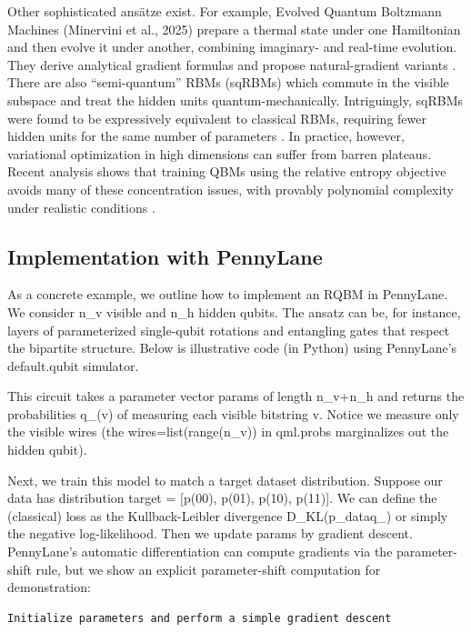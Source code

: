 \documentclass[%
oneside,                 %
final,                   %
10pt]{article}
\begin{document}
Other sophisticated ansätze exist.  For example, Evolved Quantum
Boltzmann Machines (Minervini et al., 2025) prepare a thermal state
under one Hamiltonian and then evolve it under another, combining
imaginary- and real-time evolution.  They derive analytical gradient
formulas and propose natural-gradient variants .  There are also
“semi-quantum” RBMs (sqRBMs) which commute in the visible subspace and
treat the hidden units quantum-mechanically.  Intriguingly, sqRBMs
were found to be expressively equivalent to classical RBMs, requiring
fewer hidden units for the same number of parameters . In practice,
however, variational optimization in high dimensions can suffer from
barren plateaus. Recent analysis shows that training QBMs using the
relative entropy objective avoids many of these concentration issues,
with provably polynomial complexity under realistic conditions .

\subsection*{Implementation with PennyLane}

As a concrete example, we outline how to implement an RQBM in
PennyLane. We consider n_v visible and n_h hidden qubits. The ansatz
can be, for instance, layers of parameterized single-qubit rotations
and entangling gates that respect the bipartite structure.  Below is
illustrative code (in Python) using PennyLane’s default.qubit
simulator.



This circuit takes a parameter vector params of length n_v+n_h and
returns the probabilities q_\theta(v) of measuring each visible
bitstring v.  Notice we measure only the visible wires (the
wires=list(range(n_v)) in qml.probs marginalizes out the hidden
qubit).

Next, we train this model to match a target dataset distribution.
Suppose our data has distribution target = [p(00), p(01), p(10),
p(11)].  We can define the (classical) loss as the Kullback-Leibler
divergence D_{\rm KL}(p_{\rm data}\Vert q_\theta) or simply the
negative log-likelihood.  Then we update params by gradient descent.
PennyLane’s automatic differentiation can compute gradients via the
parameter-shift rule, but we show an explicit parameter-shift
computation for demonstration:



\begin{verbatim}
Initialize parameters and perform a simple gradient descent

\end{verbatim}
\end{document}
